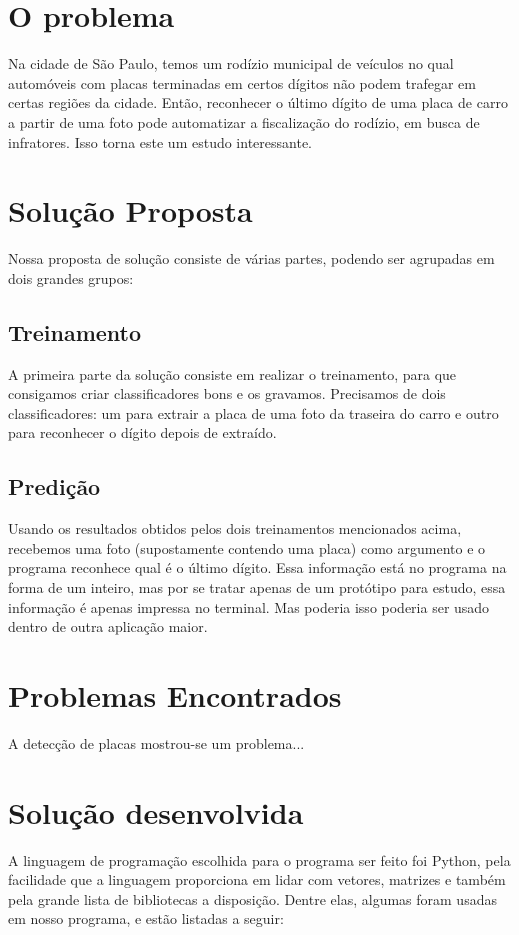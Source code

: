 \documentclass{lista}
\begin{document}
\cabecalho

\section{O problema}
Na cidade de São Paulo, temos um rodízio municipal de veículos no qual
automóveis com placas terminadas em certos dígitos não podem trafegar em
certas regiões da cidade. Então, reconhecer o último dígito de uma
placa de carro a partir de uma foto pode automatizar a fiscalização
do rodízio, em busca de infratores. Isso torna este um estudo
interessante.

\section{Solução Proposta}
Nossa proposta de solução consiste de várias partes, podendo ser
agrupadas em dois grandes grupos:

\subsection{Treinamento}
A primeira parte da solução consiste em realizar o treinamento, para
que consigamos criar classificadores bons e os gravamos.
Precisamos de dois classificadores: um para extrair a placa de uma foto
da traseira do carro e outro para reconhecer o dígito depois de extraído.

\subsection{Predição}
Usando os resultados obtidos pelos dois treinamentos mencionados acima,
recebemos uma foto (supostamente contendo uma placa) como argumento
e o programa reconhece qual é o último dígito. Essa
informação está no programa na forma de um inteiro, mas por se tratar
apenas de um protótipo para estudo, essa informação é apenas impressa
no terminal. Mas poderia isso poderia ser usado dentro de
outra aplicação maior.

\section{Problemas Encontrados}
A detecção de placas mostrou-se um problema...

\section{Solução desenvolvida}
A linguagem de programação escolhida para o programa ser feito foi Python,
pela facilidade que a linguagem proporciona em lidar com vetores, matrizes
e também pela grande lista de bibliotecas a disposição. Dentre elas,
algumas foram usadas em nosso programa, e estão listadas a seguir:
\end{document}
